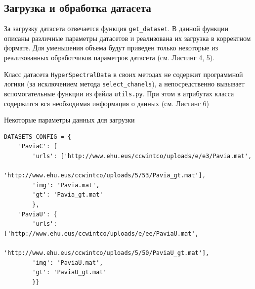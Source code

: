 \documentclass[14pt, russian]{scrartcl}
\begin{document}
\subsection{Загрузка и обработка датасета}

За загрузку датасета отвечается функция \texttt{get\_dataset}. В данной функции описаны различные параметры датасетов и реализована их загрузка в корректном формате.
Для уменьшения объема будут приведен только некоторые из реализованных обработчиков параметров датасета (см. Листинг 4, 5). 

Класс датасета \texttt{HyperSpectralData} в своих методах не содержит программной логики (за исключением метода \texttt{select\_chanels}), а непосредственно вызывает вспомогательные функции из 
файла \texttt{utils.py}. При этом в атрибутах класса содержится вся необходимая информация о данных (см. Листинг 6)

\begin{listing}[htt!]
    \caption{Некоторые параметры данных для загрузки}
    \label{lst:dataset_params}
    \begin{verbatim}
DATASETS_CONFIG = {
    'PaviaC': {
        'urls': ['http://www.ehu.eus/ccwintco/uploads/e/e3/Pavia.mat', 
                'http://www.ehu.eus/ccwintco/uploads/5/53/Pavia_gt.mat'],
        'img': 'Pavia.mat',
        'gt': 'Pavia_gt.mat'
        },
    'PaviaU': {
        'urls': ['http://www.ehu.eus/ccwintco/uploads/e/ee/PaviaU.mat',
               'http://www.ehu.eus/ccwintco/uploads/5/50/PaviaU_gt.mat'],
        'img': 'PaviaU.mat',
        'gt': 'PaviaU_gt.mat'
        }}
    \end{verbatim}
\end{listing}
\end{document}

